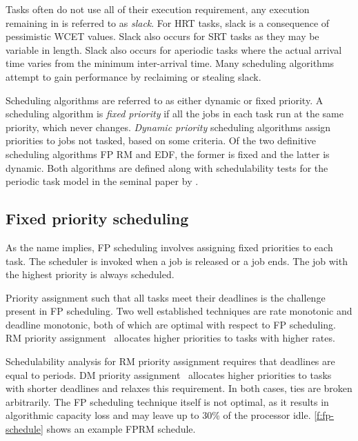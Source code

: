 Tasks often do not use all of their execution requirement, any execution remaining in is referred to
as \emph{slack}. For \gls{HRT} tasks, slack is a consequence of pessimistic \gls{WCET} values. Slack
also occurs for \gls{SRT} tasks as they may be variable in length. Slack also occurs for aperiodic
tasks where the actual arrival time varies from the minimum inter-arrival time. Many scheduling algorithms
attempt to gain performance by reclaiming or stealing slack.

Scheduling algorithms are referred to as either dynamic or fixed priority. A scheduling algorithm 
is \emph{fixed priority} if all the jobs in each task run at the same priority, which never changes. 
\emph{Dynamic priority} scheduling algorithms assign priorities to jobs not tasked, based on some criteria. 
Of the two definitive scheduling algorithms \acrlong{FP} \acrlong{RM} and \acrlong{EDF}, the former
is fixed and the latter is dynamic. Both algorithms are defined along with
schedulability tests for the periodic task model in the seminal paper by \citet{Liu_Layland_73}.

\subsection{Fixed priority scheduling}

As the name implies, \gls{FP} scheduling involves assigning fixed priorities to each task.
The scheduler is invoked when a job is released or a job ends.
The job with the highest priority is always scheduled.

Priority assignment such that all tasks meet their deadlines is the challenge present in \gls{FP} scheduling.
Two well established techniques are rate monotonic and deadline monotonic, both of which are optimal with respect to \gls{FP} scheduling.
\Gls{RM} priority assignment~\citep{Liu_Layland_73} allocates higher priorities to tasks with higher rates.

Schedulability analysis for \gls{RM} priority assignment requires that deadlines are equal to periods.
\Gls{DM} priority assignment~\citep{Leung_Whitehead_82} allocates higher priorities to tasks with shorter deadlines and relaxes this requirement.
In both cases, ties are broken arbitrarily.
The \gls{FP} scheduling technique itself is not optimal, as it results in algorithmic capacity loss
and may leave up to 30\% of the processor idle.
\cref{f:fp-schedule} shows an example \gls{FP}\gls{RM} schedule.

